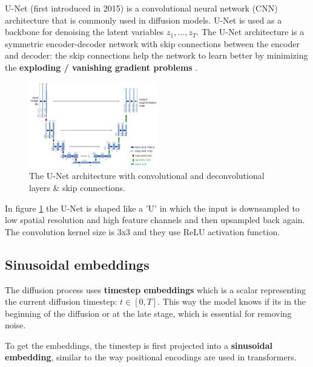 U-Net (first introduced in 2015) \cite{unet} is a convolutional neural network (CNN) architecture that is commonly used in diffusion models. U-Net is used as a backbone for denoising the latent variables $z_1, ..., z_T$. The U-Net architecture is a symmetric encoder-decoder network with skip connections between the encoder and decoder: the skip connections help the network to learn better by minimizing the \textbf{exploding / vanishing gradient problems} \cite{exploding_vanishing_gradients}.

\begin{figure}
    \centering
    \includegraphics[width=0.5\textwidth]{images/diffusion_models/stable_diffusion/u-net-architecture.png}
    \caption{The U-Net architecture \cite{unet} with convolutional and deconvolutional layers \& skip connections.}
    \label{fig:unet_architecture}
\end{figure}

In figure \ref{fig:unet_architecture} the U-Net is shaped like a 'U' in which the input is downsampled to low spatial resolution and high feature channels and then upsampled back again. The convolution kernel size is 3x3 and they use ReLU activation function.








\subsection{Sinusoidal embeddings}
\label{subsec:sinusoidal_embeddings}

The diffusion process uses \textbf{timestep embeddings} which is a scalar representing the current diffusion timestep: $t \in [0, T]$. This way the model knows if its in the beginning of the diffusion or at the late stage, which is essential for removing noise. 

To get the embeddings, the timestep is first projected into a \textbf{sinusoidal embedding}, similar to the way positional encodings are used in transformers.

